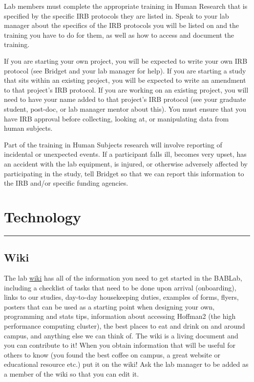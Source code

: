 \documentclass[]{book}
\begin{document}
Lab members must complete the appropriate training in Human Research that is specified by the specific IRB protocols they are listed in. Speak to your lab manager about the specifics of the IRB protocols you will be listed on and the training you have to do for them, as well as how to access and document the training.

If you are starting your own project, you will be expected to write your own IRB protocol (see Bridget and your lab manager for help). If you are starting a study that sits within an existing project, you will be expected to write an amendment to that project's IRB protocol. If you are working on an existing project, you will need to have your name added to that project's IRB protocol (see your graduate student, post-doc, or lab manager mentor about this). You must ensure that you have IRB approval before collecting, looking at, or manipulating data from human subjects.

Part of the training in Human Subjects research will involve reporting of incidental or unexpected events. If a participant falls ill, becomes very upset, has an accident with the lab equipment, is injured, or otherwise adversely affected by participating in the study, tell Bridget so that we can report this information to the IRB and/or specific funding agencies.

\hypertarget{technology}{%
\chapter{Technology}\label{technology}}

\begin{center}\rule{0.5\linewidth}{0.5pt}\end{center}

\hypertarget{wiki}{%
\section{Wiki}\label{wiki}}

The lab \href{https://bablab.github.io/bablab/}{wiki} has all of the information you need to get started in the BABLab, including a checklist of tasks that need to be done upon arrival (onboarding), links to our studies, day-to-day housekeeping duties, examples of forms, flyers, posters that can be used as a starting point when designing your own, programming and stats tips, information about accessing Hoffman2 (the high performance computing cluster), the best places to eat and drink on and around campus, and anything else we can think of. The wiki is a living document and you can contribute to it! When you obtain information that will be useful for others to know (you found the best coffee on campus, a great website or educational resource etc.) put it on the wiki! Ask the lab manager to be added as a member of the wiki so that you can edit it.
\end{document}
